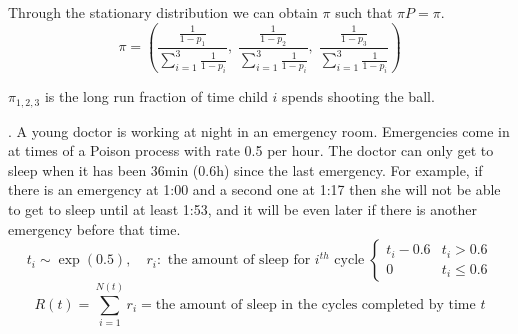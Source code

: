 \documentclass[12pt]{article}
\begin{document}
\begin{enumerate}[label=(\alph*)]
   Through the stationary distribution we can obtain $\pi$ such that $\pi P=\pi$.
   $$\pi = \left(\frac{\frac{1}{1-p_1}}{\sum\limits_{i=1}^3 \frac{1}{1-p_i}},\; \frac{\frac{1}{1-p_2}}{\sum\limits_{i=1}^3 \frac{1}{1-p_i}},\; \frac{\frac{1}{1-p_3}}{\sum\limits_{i=1}^3 \frac{1}{1-p_i}}    \right)$$
   
   $\pi_{1,2,3}$ is the long run fraction of time child $i$ spends shooting the ball.
\end{enumerate}

. A young doctor is working at night in an emergency room. Emergencies come in at times of a Poison process with rate 0.5 per hour. The doctor can only get to sleep when it has been 36min (0.6h) since the last emergency. For example, if there is an emergency at 1:00 and a second one at 1:17 then she will not be able to get to sleep until at least 1:53, and it will be even later if there is another emergency before that time.
$$t_i\sim \exp(0.5), \quad r_i:\text{ the amount of sleep for $i^{th}$ cycle}\; \begin{cases}t_i - 0.6&t_i > 0.6\\0&t_i\le 0.6 \end{cases} $$
$$R(t) = \sum\limits_{i=1}^{N(t)} r_i = \text{the amount of  sleep in the cycles completed by time $t$}$$
\end{document}
